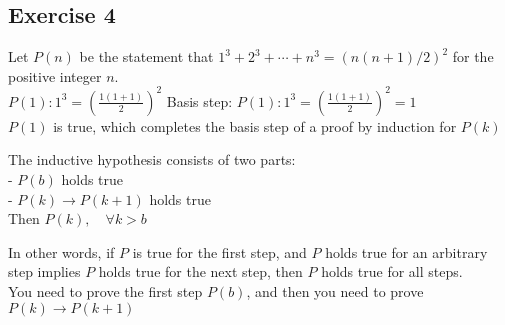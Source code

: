 \documentclass[12pt]{article}
\begin{document}
    \subsection{Exercise 4}
    Let $P(n)$ be the statement that $1^3 + 2^3 + \cdots + n^3 = (n(n + 1)/2)^2$ for the positive integer $n$.\\
        
        $P(1): 1^3 = (\frac{1(1+1)}{2})^2$
        Basis step:
            $P(1): 1^3 = (\frac{1(1+1)}{2})^2 = 1$ \\
            $P(1)$ is true, which completes the basis step of a proof by
                induction for $P(k)$
    
        The inductive hypothesis consists of two parts: \\
            - $P(b)$ holds true \\
            - $P(k) \rightarrow P(k+1)$ holds true\\
            Then $P(k), \quad \forall k > b$
    
            In other words, if $P$ is true for the first step, and $P$ holds true for an arbitrary step implies $P$ holds true for the next step, then $P$ holds true for all steps. \\
    
        You need to prove the first step $P(b)$, and then you need to prove
            $P(k) \rightarrow P(k+1)$
    
\end{document}
